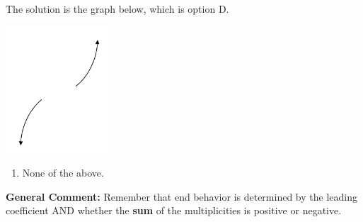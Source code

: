 \documentclass{extbook}[14pt]
\begin{document}
\begin{enumerate}
{The solution is the graph below, which is option D.
\begin{center}
    \includegraphics[width=0.3\textwidth]{../Figures/polyEndBehaviorDB.png}
\end{center}\begin{enumerate}[label=\Alph*.]
\item None of the above.\end{enumerate}
\textbf{General Comment:} Remember that end behavior is determined by the leading coefficient AND whether the \textbf{sum} of the multiplicities is positive or negative.
}
\end{enumerate}
\end{document}
